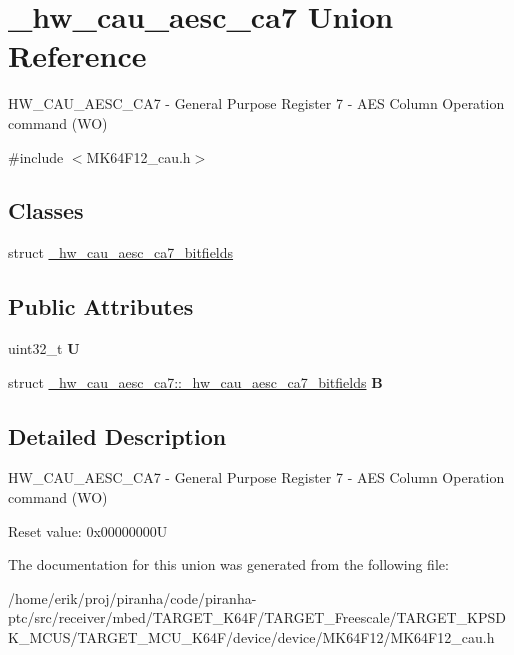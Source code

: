 \hypertarget{union__hw__cau__aesc__ca7}{}\section{\+\_\+hw\+\_\+cau\+\_\+aesc\+\_\+ca7 Union Reference}
\label{union__hw__cau__aesc__ca7}


H\+W\+\_\+\+C\+A\+U\+\_\+\+A\+E\+S\+C\+\_\+\+C\+A7 -\/ General Purpose Register 7 -\/ A\+ES Column Operation command (WO)  




{\ttfamily \#include $<$M\+K64\+F12\+\_\+cau.\+h$>$}

\subsection*{Classes}
\begin{DoxyCompactItemize}
\item 
struct \hyperlink{struct__hw__cau__aesc__ca7_1_1__hw__cau__aesc__ca7__bitfields}{\+\_\+hw\+\_\+cau\+\_\+aesc\+\_\+ca7\+\_\+bitfields}
\end{DoxyCompactItemize}
\subsection*{Public Attributes}
\begin{DoxyCompactItemize}
\item 
uint32\+\_\+t {\bfseries U}\hypertarget{union__hw__cau__aesc__ca7_a54e5355f3f4af35640874e08cd5a27a8}{}\label{union__hw__cau__aesc__ca7_a54e5355f3f4af35640874e08cd5a27a8}

\item 
struct \hyperlink{struct__hw__cau__aesc__ca7_1_1__hw__cau__aesc__ca7__bitfields}{\+\_\+hw\+\_\+cau\+\_\+aesc\+\_\+ca7\+::\+\_\+hw\+\_\+cau\+\_\+aesc\+\_\+ca7\+\_\+bitfields} {\bfseries B}\hypertarget{union__hw__cau__aesc__ca7_a7d0930f79c063b852ca83866c3e5c96e}{}\label{union__hw__cau__aesc__ca7_a7d0930f79c063b852ca83866c3e5c96e}

\end{DoxyCompactItemize}


\subsection{Detailed Description}
H\+W\+\_\+\+C\+A\+U\+\_\+\+A\+E\+S\+C\+\_\+\+C\+A7 -\/ General Purpose Register 7 -\/ A\+ES Column Operation command (WO) 

Reset value\+: 0x00000000U 

The documentation for this union was generated from the following file\+:\begin{DoxyCompactItemize}
\item 
/home/erik/proj/piranha/code/piranha-\/ptc/src/receiver/mbed/\+T\+A\+R\+G\+E\+T\+\_\+\+K64\+F/\+T\+A\+R\+G\+E\+T\+\_\+\+Freescale/\+T\+A\+R\+G\+E\+T\+\_\+\+K\+P\+S\+D\+K\+\_\+\+M\+C\+U\+S/\+T\+A\+R\+G\+E\+T\+\_\+\+M\+C\+U\+\_\+\+K64\+F/device/device/\+M\+K64\+F12/M\+K64\+F12\+\_\+cau.\+h\end{DoxyCompactItemize}
